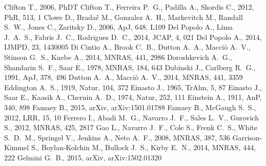 \documentclass[a4wide,12pt]{book}
\begin{document}
{\begin{thebibliography}{}
Clifton T., 2006, PhDT
 Clifton T., Ferreira P.~G., Padilla A., 
Skordis C., 2012, PhR, 513, 1  
Clowe D., Brada{\v c} M., Gonzalez A.~H., Markevitch M., Randall S.~W., 
Jones C., Zaritsky D., 2006, ApJ, 648, L109
 Del Popolo A., Lima J.~A.~S., Fabris 
J.~C., Rodrigues D.~C., 2014, JCAP, 4, 021 
Del Popolo A., 2014, IJMPD, 23, 1430005  
 Di Cintio A., Brook C.~B., Dutton A.~A., 
Macci{\`o} A.~V., Stinson G.~S., Knebe A., 2014, MNRAS, 441, 2986 
 Doroshkevich A.~G., Shandarin S.~F., Saar E., 1978, MNRAS, 184, 643 
 Dubinski J., Carlberg R.~G., 1991, ApJ, 378, 496 
 Dutton A.~A., Macci{\`o} A.~V., 2014, MNRAS, 441, 3359 
Eddington A.~S., 1919, Natur, 104, 372
Einasto J., 1965, TrAlm, 5, 87
 Einasto J., Saar E., Kaasik A., Chernin 
A.~D., 1974, Natur, 252, 111 
Einstein A., 1911, AnP, 340, 898 
 Famaey 
B., 2015, arXiv, arXiv:1501.01788 
 Famaey B., McGaugh S.~S., 2012, LRR, 15, 10 
 Ferrero I., Abadi M.~G., Navarro J.~F., 
Sales L.~V., Gurovich S., 2012, MNRAS, 425, 2817
Gao L., Navarro J.~F., Cole S., Frenk C.~S., White S.~D.~M., Springel V., 
Jenkins A., Neto A.~F., 2008, MNRAS, 387, 536
 Garrison-Kimmel S., Boylan-Kolchin M., 
Bullock J.~S., Kirby E.~N., 2014, MNRAS, 444, 222  
Gelmini G.~B., 2015, arXiv, arXiv:1502.01320

\end{thebibliography}}
\end{document}
